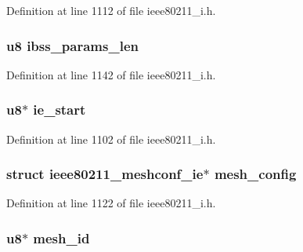 Definition at line 1112 of file ieee80211\-\_\-i.\-h.

\hypertarget{structieee802__11__elems_ae1caf3e856db41c098dae539cce1b7b9}{
\subsubsection[{ibss\-\_\-params\-\_\-len}]{\setlength{\rightskip}{0pt plus 5cm}u8 ibss\-\_\-params\-\_\-len}}\label{structieee802__11__elems_ae1caf3e856db41c098dae539cce1b7b9}


Definition at line 1142 of file ieee80211\-\_\-i.\-h.

\hypertarget{structieee802__11__elems_ac67563c8768abab887c25047515b040c}{
\subsubsection[{ie\-\_\-start}]{\setlength{\rightskip}{0pt plus 5cm}u8$\ast$ ie\-\_\-start}}\label{structieee802__11__elems_ac67563c8768abab887c25047515b040c}


Definition at line 1102 of file ieee80211\-\_\-i.\-h.

\hypertarget{structieee802__11__elems_acb3adcd722f89d8cce1e7be9129d6bc4}{
\subsubsection[{mesh\-\_\-config}]{\setlength{\rightskip}{0pt plus 5cm}struct ieee80211\-\_\-meshconf\-\_\-ie$\ast$ mesh\-\_\-config}}\label{structieee802__11__elems_acb3adcd722f89d8cce1e7be9129d6bc4}


Definition at line 1122 of file ieee80211\-\_\-i.\-h.

\hypertarget{structieee802__11__elems_a0f1538fd176045e5a10de47f5cefd754}{
\subsubsection[{mesh\-\_\-id}]{\setlength{\rightskip}{0pt plus 5cm}u8$\ast$ mesh\-\_\-id}}\label{structieee802__11__elems_a0f1538fd176045e5a10de47f5cefd754}


